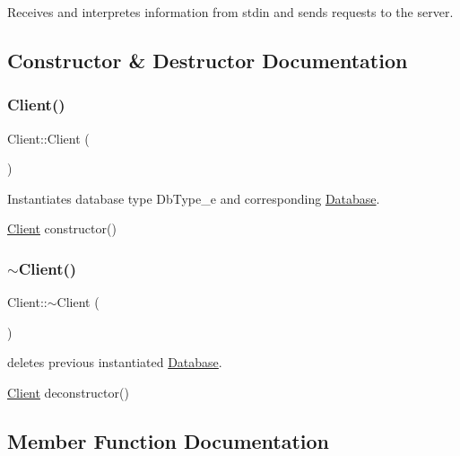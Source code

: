 Receives and interpretes information from stdin and sends requests to the server. 

\subsection{Constructor \& Destructor Documentation}
\mbox{\label{classClient_ae51af7aa6b8f591496a8f6a4a87a14bf}} 
\subsubsection{\texorpdfstring{Client()}{Client()}}
{\footnotesize\ttfamily Client\+::\+Client (\begin{DoxyParamCaption}{ }\end{DoxyParamCaption})\hspace{0.3cm}{\ttfamily [inline]}}



Instantiates database type Db\+Type\+\_\+e and corresponding \hyperlink{classDatabase}{Database}. 

\hyperlink{classClient}{Client} constructor() \mbox{\label{classClient_a840e519ca781888cbd54181572ebe3a7}} 
\subsubsection{\texorpdfstring{$\sim$\+Client()}{~Client()}}
{\footnotesize\ttfamily Client\+::$\sim$\+Client (\begin{DoxyParamCaption}{ }\end{DoxyParamCaption})\hspace{0.3cm}{\ttfamily [inline]}}



deletes previous instantiated \hyperlink{classDatabase}{Database}. 

\hyperlink{classClient}{Client} deconstructor() 

\subsection{Member Function Documentation}
\mbox{\label{classClient_a62807c316030505b03b90186d3b06a25}} 
